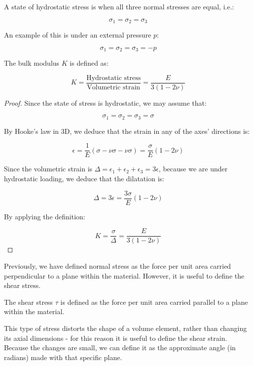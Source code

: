 \documentclass{article}
\begin{document}
\begin{definition}
    A state of hydrostatic stress is when all three normal stresses are equal, i.e.:

    \[ \sigma_1 = \sigma_2 = \sigma_3 \]

    An example of this is under an external pressure $p$:

    \[ \sigma_1 = \sigma_2 = \sigma_3 = -p \]
\end{definition}

\begin{proposition}
    The bulk modulus $K$ is defined as:

    \[ K = \frac{\text{Hydrostatic stress}}{\text{Volumetric strain}} = \frac{E}{3(1 - 2\nu)} \]
\end{proposition}

\begin{proof}
    Since the state of stress is hydrostatic, we may assume that:

    \[ \sigma_1 = \sigma_2 = \sigma_3 = \sigma \]

    By Hooke's law in 3D, we deduce that the strain in any of the axes' directions is:

    \[ \epsilon = \frac{1}{E}(\sigma - \nu\sigma - \nu\sigma) = \frac{\sigma}{E}(1 - 2\nu) \]

    Since the volumetric strain is $\Delta = \epsilon_1 + \epsilon_2 + \epsilon_3 = 3\epsilon$, because we are under hydrostatic loading, we deduce that the dilatation is:

    \[ \Delta = 3\epsilon = \frac{3\sigma}{E}(1 - 2\nu) \]

    By applying the definition:

    \[ K = \frac{\sigma}{\Delta} = \frac{E}{3(1 - 2\nu)} \]
\end{proof}

Previously, we have defined normal stress as the force per unit area carried perpendicular to a plane within the material. However, it is useful to define the shear stress.

\begin{definition}
    The shear stress $\tau$ is defined as the force per unit area carried parallel to a plane within the material.
\end{definition}

This type of stress distorts the shape of a volume element, rather than changing its axial dimensions - for this reason it is useful to define the shear strain. Because the changes are small, we can define it as the approximate angle (in radians) made with that specific plane.
\end{document}
